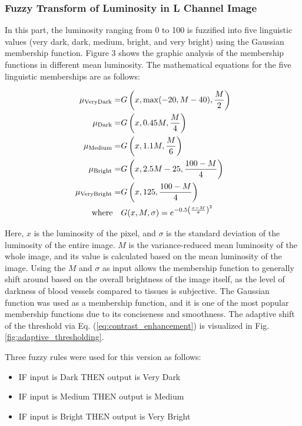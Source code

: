 \subsubsection{Fuzzy Transform of Luminosity in L Channel Image}
In this part, the luminosity ranging from 0 to 100 is fuzzified into five linguistic values (very dark, dark, medium, bright, and very bright) using the Gaussian membership function.  Figure 3 shows the graphic analysis of the membership functions in different mean luminosity.  The mathematical equations for the five linguistic memberships are as follows:

\begin{align}
    \mu_{\text{VeryDark}} =& G \left( x, \max(-20, M - 40), \frac{M}{2} \right) \notag \\
    \mu_{\text{Dark}} =& G \left( x, 0.45M, \frac{M}{4} \right) \notag \\
    \mu_{\text{Medium}} =& G \left( x, 1.1M, \frac{M}{6} \right) \notag \\
    \mu_{\text{Bright}} =& G \left( x, 2.5M - 25, \frac{100 - M}{4} \right) \notag \\
    \mu_{\text{VeryBright}} =& G \left( x, 125, \frac{100 - M}{4} \right) \notag \\
    \text{where} \quad & G(x, M, \sigma) = e^{-0.5 \left( \frac{x - M}{\sigma} \right)^2}
    \label{eq:contrast_enhancement}
\end{align}

Here, $x$ is the luminosity of the pixel, and $\sigma$ is the standard deviation of the luminosity of the entire image. $M$ is the variance-reduced mean luminosity of the whole image, and its value is calculated based on the mean luminosity of the image. Using the $M$ and $\sigma$ as input allows the membership function to generally shift around based on the overall brightness of the image itself, as the level of darkness of blood vessels compared to tissues is subjective. The Gaussian function was used as a membership function, and it is one of the most popular membership functions due to its conciseness and smoothness. The adaptive shift of the threshold via Eq. (\ref{eq:contrast_enhancement}) is visualized in Fig. \ref{fig:adaptive_thresholding}.



Three fuzzy rules were used for this version as follows:
\begin{itemize}
    \item{IF input is Dark THEN output is Very Dark}
    \item{IF input is Medium THEN output is Medium}
    \item{IF input is Bright THEN output is Very Bright}
\end{itemize}

